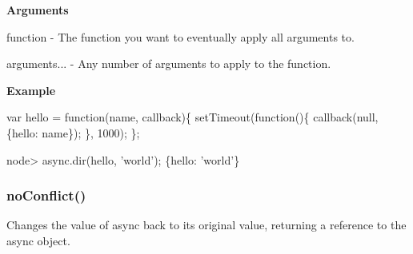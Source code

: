 {\bfseries Arguments}


\begin{DoxyItemize}
\item {\ttfamily function} -\/ The function you want to eventually apply all arguments to.
\item {\ttfamily arguments...} -\/ Any number of arguments to apply to the function.
\end{DoxyItemize}

{\bfseries Example}


\begin{DoxyCode}
var hello = function(name, callback)\{
    setTimeout(function()\{
        callback(null, \{hello: name\});
    \}, 1000);
\};
\end{DoxyCode}
 
\begin{DoxyCode}
node> async.dir(hello, 'world');
\{hello: 'world'\}
\end{DoxyCode}
 



\label{_noConflict}%
 \subsubsection*{no\+Conflict()}

Changes the value of {\ttfamily async} back to its original value, returning a reference to the {\ttfamily async} object. 